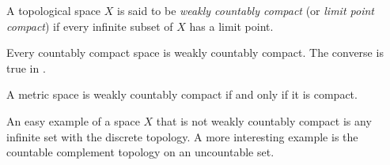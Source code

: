 \documentclass{article}
\begin{document}
A topological space $X$ is said to be \emph{weakly countably compact}
(or \emph{limit point compact})
if every infinite subset of $X$ has a limit point.

Every countably compact space is weakly countably compact.
The converse is true in .

A metric space is weakly countably compact if and only if it is compact.

An easy example of a space $X$
that is not weakly countably compact
is any infinite set with the discrete topology.
A more interesting example is the countable complement topology
on an uncountable set.
\end{document}
